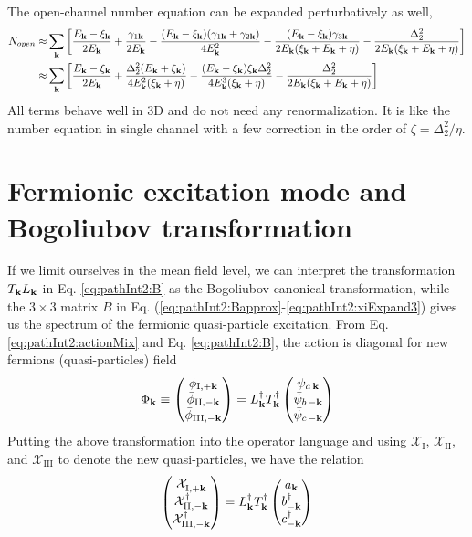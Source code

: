 The open-channel number equation  can be expanded perturbatively as well, \begin{equation}
\begin{split}
N_{open}\approx&\sum_{\mathbf{k}}\left[\frac{E_{\mathbf{k}}-\xi_{\mathbf{k}}}{2E_{\mathbf{k}}}+\frac{\gamma_{1\mathbf{k}}}{2E_{\mathbf{k}}}
	-\frac{(E_{\mathbf{k}}-\xi_{\mathbf{k}})(\gamma_{1\mathbf{k}}+\gamma_{2\mathbf{k}})}{4E_{\mathbf{k}}^2}
	-\frac{(E_{\mathbf{k}}-\xi_{\mathbf{k}})\gamma_{3\mathbf{k}}}{2E_{\mathbf{k}}(\xi_{\mathbf{k}}+E_{\mathbf{k}}+\eta)}
	-\frac{\Delta_{2}^{2}}{2E_{\mathbf{k}}(\xi_{\mathbf{k}}+E_{\mathbf{k}}+\eta)}\right]\\
	\approx&\sum_{\mathbf{k}}\left[\frac{E_{\mathbf{k}}-\xi_{\mathbf{k}}}{2E_{\mathbf{k}}}+\frac{{\Delta_{2}^{2}(E_{\mathbf{k}}+\xi_{\mathbf{k}})}}{4E_{\mathbf{k}}^{2}(\xi_{\mathbf{k}}+\eta)}
	-\frac{(E_{\mathbf{k}}-\xi_{\mathbf{k}})\xi_{\mathbf{k}}\Delta_{2}^{2}}{4E_{\mathbf{k}}^3(\xi_{\mathbf{k}}+\eta)}
	-\frac{\Delta_{2}^{2}}{2E_{\mathbf{k}}(\xi_{\mathbf{k}}+E_{\mathbf{k}}+\eta)}\right]	
\end{split}
\end{equation}
All terms behave well  in 3D and do not need any renormalization.   It is like the number equation in single channel with  a few correction in the order of $\zeta=\Delta_2^2/\eta$.  

%

\section{Fermionic excitation mode and Bogoliubov transformation\label{sec:pathInt2:bog}}
If we limit ourselves in the mean field level, we can interpret the transformation $T_{\mathbf{k}}{}L_{\mathbf{k}}$ in Eq. \eqref{eq:pathInt2:B} as the Bogoliubov canonical transformation, while  the $3\times3$ matrix $B$ in Eq. (\ref{eq:pathInt2:Bapprox}-\ref{eq:pathInt2:xiExpand3}) gives us the spectrum of the  fermionic quasi-particle excitation. From Eq. \eqref{eq:pathInt2:actionMix} and Eq. \eqref{eq:pathInt2:B}, the action is diagonal for new fermions (quasi-particles) field 
\begin{equation*}
\Phi_\vk\equiv\mtrx{\phi_{\text{\Rmnum{1}},+\vk}\\\bar\phi_{\text{\Rmnum{2}},-\vk}\\\bar\phi_{\text{\Rmnum{3}},-\vk}}
=L^{\dg}_{\vk}T^{\dg}_{\vk}\mtrx{\psi_{a\,\vk}\\\bar\psi_{b\,-\vk}\\\bar\psi_{c\,-\vk}}
\end{equation*}
Putting the above transformation into the operator language and using $\mathcal{X}_{\text{I}}$, $\mathcal{X}_{\text{II}}$, and $\mathcal{X}_{\text{III}}$ to denote the new quasi-particles,  we have the relation 
\begin{equation}
\mtrx{\mathcal{X}^{}_{\text{\Rmnum{1}},+\vk}\\\mathcal{X}_{\text{II},-\vk}^{\dg}\\\mathcal{X}_{\text{III},-\vk}^{\dg}}
=L^{\dg}_{\vk}T^{\dg}_{\vk}  \mtrx{a_{\vk}\\b_{-\vk}^{\dg}\\c_{-\vk}^{\dg}}
\end{equation}   

